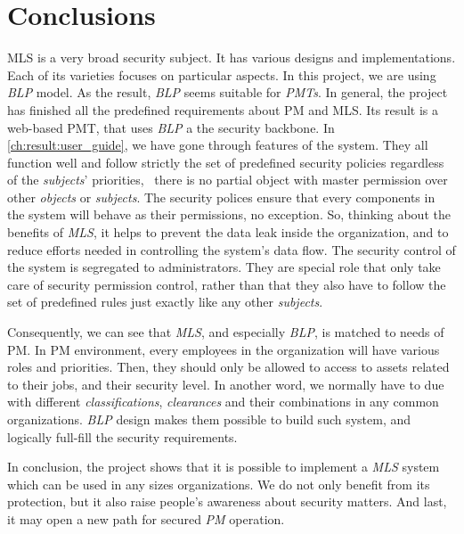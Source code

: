 
\chapter{Conclusions} %

\label{ch:conclusion} 

MLS is a very broad security subject.
It has various designs and implementations.
Each of its varieties focuses on particular aspects.
In this project, we are using \emph{BLP} model.
As the result, \emph{BLP} seems suitable for \emph{PMTs}.
In general, the project has finished all the predefined requirements about PM and MLS.
Its result is a web-based PMT, that uses \emph{BLP} a the security backbone.
In \autoref{ch:result:user_guide}, we have gone through features of the system.
They all function well and follow strictly the set of predefined security policies regardless of the \emph{subjects}' priorities, \ie\ there is no partial object with master permission over other \emph{objects} or \emph{subjects}.
The security polices ensure that every components in the system will behave as their permissions, no exception.
So, thinking about the benefits of \emph{MLS}, it helps to prevent the data leak inside the organization, and to reduce efforts needed in controlling the system's data flow.
The security control of the system is segregated to administrators.
They are special role that only take care of security permission control, rather than that they also have to follow the set of predefined rules just exactly like any other \emph{subjects}.

Consequently, we can see that \emph{MLS}, and especially \emph{BLP}, is matched to needs of PM.
In PM environment, every employees in the organization will have various roles and priorities.
Then, they should only be allowed to access to assets related to their jobs, and their security level.
In another word, we normally have to due with different \emph{classifications}, \emph{clearances} and their combinations in any common organizations.
\emph{BLP} design makes them possible to build such system, and logically full-fill the security requirements.

In conclusion, the project shows that it is possible to implement a \emph{MLS} system which can be used in any sizes organizations.
We do not only benefit from its protection, but it also raise people's awareness about security matters.
And last, it may open a new path for secured \emph{PM} operation.
